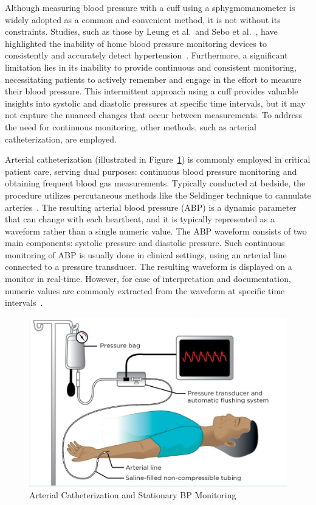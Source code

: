 Although measuring blood pressure with a cuff using a sphygmomanometer is widely adopted as a common and convenient method, it is not without its constraints.
Studies, such as those by Leung et al.\ and Sebo et al.\ , have highlighted the inability of home blood pressure monitoring devices to consistently and accurately detect hypertension~\cite{leungHypertensionCanada20162016, seboBloodPressureMeasurements2014}.
Furthermore, a significant limitation lies in its inability to provide continuous and consistent monitoring, necessitating patients to actively remember and engage in the effort to measure their blood pressure.
This intermittent approach using a cuff provides valuable insights into systolic and diastolic pressures at specific time intervals, but it may not capture the nuanced changes that occur between measurements.
To address the need for continuous monitoring, other methods, such as arterial catheterization, are employed.

Arterial catheterization (illustrated in Figure~\ref{fig:catheter}) is commonly employed in critical patient care, serving dual purposes: continuous blood pressure monitoring and obtaining frequent blood gas measurements.
Typically conducted at bedside, the procedure utilizes percutaneous methods like the Seldinger technique to cannulate arteries~\cite{clarkArterialCatheterization1992}.
The resulting arterial blood pressure (ABP) is a dynamic parameter that can change with each heartbeat, and it is typically represented as a waveform rather than a single numeric value.
The ABP waveform consists of two main components: systolic pressure and diastolic pressure.
Such continuous monitoring of ABP is usually done in clinical settings, using an arterial line connected to a pressure transducer.
The resulting waveform is displayed on a monitor in real-time.
However, for ease of interpretation and documentation, numeric values are commonly extracted from the waveform at specific time intervals~\cite{hillImputationContinuousArterial2021}.

\begin{figure}[h]
    \centering
    \includegraphics[scale=0.4]{images/abp/catheter}
    \caption{Arterial Catheterization and Stationary BP Monitoring~\cite{contributorEssentialCriticalCare2021}}
    \label{fig:catheter}
\end{figure}

